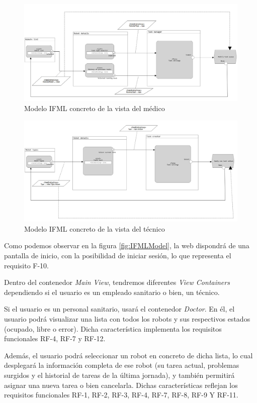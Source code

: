 \begin{figure}[H]
	\centering
	\includegraphics[width=1\textwidth]{images/Doctor-IFML.PNG}
	\caption{Modelo IFML concreto de la vista del médico}
	\label{fig:IFMLDoctor}
\end{figure}

\begin{figure}[H]
	\centering
	\includegraphics[width=1\textwidth]{images/Tech-IFML.PNG}
	\caption{Modelo IFML concreto de la vista del técnico}
	\label{fig:IFMLTech}
\end{figure}

Como podemos observar en la figura \ref{fig:IFMLModel}, la web dispondrá de una pantalla de inicio, con la posibilidad de iniciar sesión, lo que representa el requisito F-10.

Dentro del contenedor \textit{Main View}, tendremos diferentes \textit{View Containers} dependiendo si el usuario es un empleado sanitario o bien, un técnico.

Si el usuario es un personal sanitario, usará el contenedor \textit{Doctor}. En él, el usuario podrá visualizar una lista con todos los robots y sus respectivos estados (ocupado, libre o error). Dicha característica implementa los requisitos funcionales RF-4, RF-7 y RF-12. 

Además, el usuario podrá seleccionar un robot en concreto de dicha lista, lo cual desplegará la información completa de ese robot (su tarea actual, problemas surgidos y el historial de tareas de la última jornada), y también permitirá asignar una nueva tarea o bien cancelarla. Dichas características reflejan los requisitos funcionales RF-1, RF-2, RF-3, RF-4, RF-7, RF-8, RF-9 Y RF-11.

